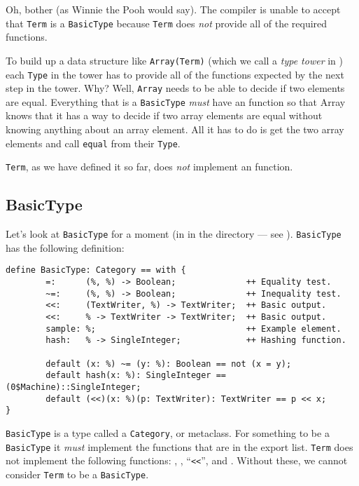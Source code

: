 Oh, bother (as Winnie the Pooh would say). The compiler is unable to accept 
that \verb"Term" is a \verb"BasicType" because \verb"Term" does {\em not\/} provide all of the 
required functions.

To build up a data structure like \verb"Array(Term)" (which we call a 
{\em type tower} in \asharp{}) each \verb"Type" in the tower has to
provide all of the functions expected by the next step in the tower.
Why? Well, \verb"Array" needs to be able to decide if two elements
are equal. Everything that is a \verb"BasicType" {\em must\/} have
an \ttin{=} function so that Array knows that it has a way to decide
if two array elements are equal without knowing anything about an array
element. All it has to do is get the two array elements and call
\verb"equal" from their \verb"Type". 

\verb"Term", as we have defined it so far, does {\em not\/} implement an \ttin{=} function.

\subsection{BasicType}

Let's look at \verb"BasicType" for a moment (in  in 
the\asharp{} \linebreak
{} directory --- see ).
\verb"BasicType" has the following definition:

\begin{small}
\begin{verbatim}
define BasicType: Category == with {
        =:      (%, %) -> Boolean;              ++ Equality test.
        ~=:     (%, %) -> Boolean;              ++ Inequality test.
        <<:     (TextWriter, %) -> TextWriter;  ++ Basic output.
        <<:     % -> TextWriter -> TextWriter;  ++ Basic output.
        sample: %;                              ++ Example element.
        hash:   % -> SingleInteger;             ++ Hashing function.

        default (x: %) ~= (y: %): Boolean == not (x = y);
        default hash(x: %): SingleInteger == (0$Machine)::SingleInteger;
        default (<<)(x: %)(p: TextWriter): TextWriter == p << x;
}
\end{verbatim}
\end{small}

\verb"BasicType" is a type called a \verb"Category", or metaclass. For 
something to be a 
\verb"BasicType" it {\em must\/} implement the functions that are in the export 
list. \verb"Term" does not implement the following functions: \ttin{=},
\ttin{\~{}=}, ``\verb+<<+'',  and .
Without these, we cannot consider \verb"Term" to be a \verb"BasicType".

